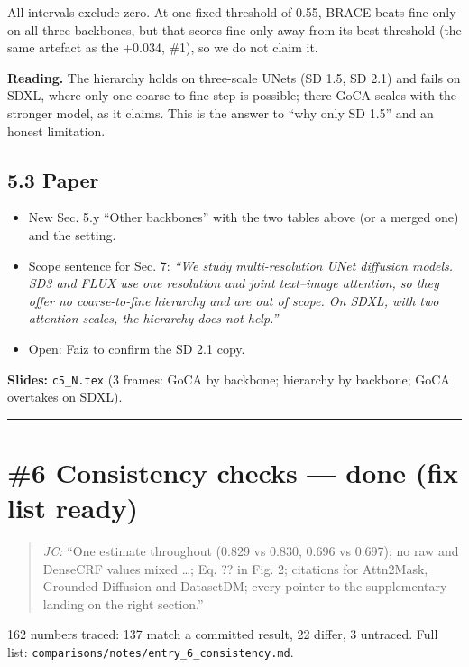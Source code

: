 \documentclass[
  10pt,
]{article}
\providecommand{\tightlist}{%
  \setlength{\itemsep}{0pt}\setlength{\parskip}{0pt}}
\begin{document}
All intervals exclude zero. At one fixed threshold of 0.55, BRACE beats
fine-only on all three backbones, but that scores fine-only away from
its best threshold (the same artefact as the +0.034, \#1), so we do not
claim it.

\textbf{Reading.} The hierarchy holds on three-scale UNets (SD 1.5, SD
2.1) and fails on SDXL, where only one coarse-to-fine step is possible;
there GoCA scales with the stronger model, as it claims. This is the
answer to ``why only SD 1.5'' and an honest limitation.

\subsection{5.3 Paper}

\begin{itemize}
\tightlist
\item
  New Sec. 5.y ``Other backbones'' with the two tables above (or a
  merged one) and the setting.
\item
  Scope sentence for Sec. 7: \emph{``We study multi-resolution UNet
  diffusion models. SD3 and FLUX use one resolution and joint
  text--image attention, so they offer no coarse-to-fine hierarchy and
  are out of scope. On SDXL, with two attention scales, the hierarchy
  does not help.''}
\item
  Open: Faiz to confirm the SD 2.1 copy.
\end{itemize}

\textbf{Slides:} \texttt{c5\_N.tex} (3 frames: GoCA by backbone;
hierarchy by backbone; GoCA overtakes on SDXL).

\begin{center}\rule{0.5\linewidth}{0.5pt}\end{center}

\section{\#6 Consistency checks --- done (fix list ready)}

\begin{quote}
\emph{JC:} ``One estimate throughout (0.829 vs 0.830, 0.696 vs 0.697);
no raw and DenseCRF values mixed \ldots; \guillemotleft{}Eq. ??\guillemotright{} in Fig. 2; citations
for Attn2Mask, Grounded Diffusion and DatasetDM; every pointer to the
supplementary landing on the right section.''
\end{quote}

162 numbers traced: 137 match a committed result, 22 differ, 3 untraced.
Full list: \texttt{comparisons/notes/entry\_6\_consistency.md}.
\end{document}
